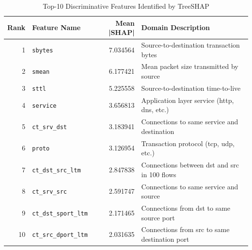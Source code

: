 \begin{table}[htbp]
\caption{Top-10 Discriminative Features Identified by TreeSHAP}
\label{tab:shap_features}
\centering
\begin{tabular}{rlrl}
\hline
\textbf{Rank} & \textbf{Feature Name} & \textbf{Mean |SHAP|} & \textbf{Domain Description} \\
\hline
1 & \texttt{sbytes} & 7.034564 & Source-to-destination transaction bytes \\
2 & \texttt{smean} & 6.177421 & Mean packet size transmitted by source \\
3 & \texttt{sttl} & 5.225558 & Source-to-destination time-to-live \\
4 & \texttt{service} & 3.656813 & Application layer service (http, dns, etc.) \\
5 & \texttt{ct_srv_dst} & 3.183941 & Connections to same service and destination \\
6 & \texttt{proto} & 3.126954 & Transaction protocol (tcp, udp, etc.) \\
7 & \texttt{ct_dst_src_ltm} & 2.847838 & Connections between dst and src in 100 flows \\
8 & \texttt{ct_srv_src} & 2.591747 & Connections to same service and source \\
9 & \texttt{ct_dst_sport_ltm} & 2.171465 & Connections from dst to same source port \\
10 & \texttt{ct_src_dport_ltm} & 2.031635 & Connections from src to same destination port \\
\hline
\end{tabular}
\end{table}
